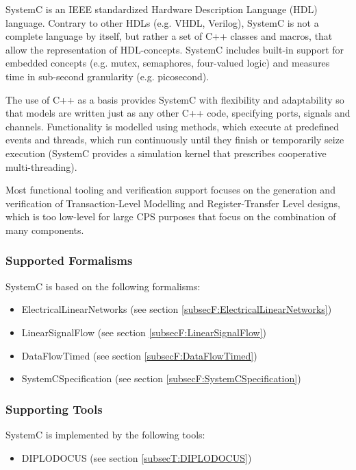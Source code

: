 SystemC is an IEEE standardized Hardware Description Language (HDL) language.
Contrary to other HDLs (e.g. VHDL, Verilog), SystemC is not a complete language by itself, but rather a set of C++ classes and macros, that allow the representation of HDL-concepts.
SystemC includes built-in support for embedded concepts (e.g. mutex, semaphores, four-valued logic) and measures time in sub-second granularity (e.g. picosecond).

The use of C++ as a basis provides SystemC with flexibility and adaptability so that models are written just as any other C++ code, specifying ports, signals and channels. Functionality is modelled using methods, which execute at predefined events and threads, which run continuously until they finish or temporarily seize execution (SystemC provides a simulation kernel that prescribes cooperative multi-threading).

Most functional tooling and verification support focuses on the generation and verification of  Transaction-Level Modelling and Register-Transfer Level designs, which is too low-level for large CPS purposes that focus on the combination of many components.


\subsubsection{Supported Formalisms}

SystemC is based on the following formalisms:
\begin{itemize}
	\item ElectricalLinearNetworks (see section \ref{subsecF:ElectricalLinearNetworks})
	\item LinearSignalFlow (see section \ref{subsecF:LinearSignalFlow})
	\item DataFlowTimed (see section \ref{subsecF:DataFlowTimed})
	\item SystemCSpecification (see section \ref{subsecF:SystemCSpecification})
\end{itemize}


\subsubsection{Supporting Tools}

SystemC is implemented by the following tools:
\begin{itemize}
	\item DIPLODOCUS (see section \ref{subsecT:DIPLODOCUS})
\end{itemize}


